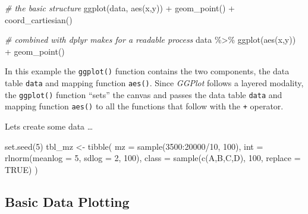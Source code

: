 \documentclass[
]{book}
\newenvironment{Shaded}{\begin{snugshade}}{\end{snugshade}}
\newcommand{\AttributeTok}[1]{\textcolor[rgb]{0.77,0.63,0.00}{#1}}
\newcommand{\CommentTok}[1]{\textcolor[rgb]{0.56,0.35,0.01}{\textit{#1}}}
\newcommand{\ConstantTok}[1]{\textcolor[rgb]{0.00,0.00,0.00}{#1}}
\newcommand{\DecValTok}[1]{\textcolor[rgb]{0.00,0.00,0.81}{#1}}
\newcommand{\FunctionTok}[1]{\textcolor[rgb]{0.00,0.00,0.00}{#1}}
\newcommand{\NormalTok}[1]{#1}
\newcommand{\OtherTok}[1]{\textcolor[rgb]{0.56,0.35,0.01}{#1}}
\newcommand{\SpecialCharTok}[1]{\textcolor[rgb]{0.00,0.00,0.00}{#1}}
\newcommand{\StringTok}[1]{\textcolor[rgb]{0.31,0.60,0.02}{#1}}
\begin{document}
\begin{Shaded}
\begin{Highlighting}[]
\CommentTok{\# the basic structure}
\FunctionTok{ggplot}\NormalTok{(data, }\FunctionTok{aes}\NormalTok{(x,y)) }\SpecialCharTok{+} \FunctionTok{geom\_point}\NormalTok{() }\SpecialCharTok{+} \FunctionTok{coord\_cartiesian}\NormalTok{()}

\CommentTok{\# combined with dplyr makes for a readable process}
\NormalTok{data }\SpecialCharTok{\%\textgreater{}\%} \FunctionTok{ggplot}\NormalTok{(}\FunctionTok{aes}\NormalTok{(x,y)) }\SpecialCharTok{+} \FunctionTok{geom\_point}\NormalTok{()}
\end{Highlighting}
\end{Shaded}

In this example the \texttt{ggplot()} function contains the two components, the data table \texttt{data} and mapping function \texttt{aes()}. Since \emph{GGPlot} follows a layered modality, the \texttt{ggplot()} function ``sets'' the canvas and passes the data table \texttt{data} and mapping function \texttt{aes()} to all the functions that follow with the \texttt{+} operator.

Lets create some data \ldots{}

\begin{Shaded}
\begin{Highlighting}[]
\FunctionTok{set.seed}\NormalTok{(}\DecValTok{5}\NormalTok{)}
\NormalTok{tbl\_mz }\OtherTok{\textless{}{-}} \FunctionTok{tibble}\NormalTok{(}
  \AttributeTok{mz =} \FunctionTok{sample}\NormalTok{(}\DecValTok{3500}\SpecialCharTok{:}\DecValTok{20000}\SpecialCharTok{/}\DecValTok{10}\NormalTok{, }\DecValTok{100}\NormalTok{),}
  \AttributeTok{int =} \FunctionTok{rlnorm}\NormalTok{(}\AttributeTok{meanlog =} \DecValTok{5}\NormalTok{, }\AttributeTok{sdlog =} \DecValTok{2}\NormalTok{, }\DecValTok{100}\NormalTok{),}
  \AttributeTok{class =} \FunctionTok{sample}\NormalTok{(}\FunctionTok{c}\NormalTok{(}\StringTok{\textquotesingle{}A\textquotesingle{}}\NormalTok{,}\StringTok{\textquotesingle{}B\textquotesingle{}}\NormalTok{,}\StringTok{\textquotesingle{}C\textquotesingle{}}\NormalTok{,}\StringTok{\textquotesingle{}D\textquotesingle{}}\NormalTok{), }\DecValTok{100}\NormalTok{, }\AttributeTok{replace =} \ConstantTok{TRUE}\NormalTok{) }
\NormalTok{)}
\end{Highlighting}
\end{Shaded}

\hypertarget{basic-data-plotting}{%
\subsection{Basic Data Plotting}\label{basic-data-plotting}}
\end{document}

